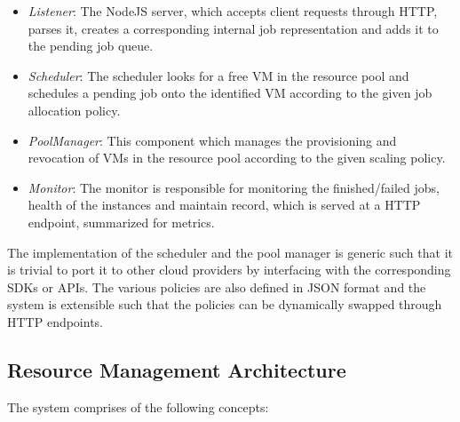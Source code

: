 \documentclass[a4paper]{IEEEtran}
\begin{document}
 \begin{itemize}
   \item \emph{Listener}: The NodeJS server, which accepts client requests through HTTP, parses it, creates a 
   corresponding internal job representation and adds it to the pending job queue.
   \item \emph{Scheduler}: The scheduler looks for a free VM in the resource pool and schedules a pending job
   onto the identified VM according to the given job allocation policy.
   \item \emph{PoolManager}: This component which manages the provisioning and revocation of VMs in the resource 
   pool according to the given scaling policy.
   \item \emph{Monitor}: The monitor is responsible for monitoring the finished/failed jobs, health of the instances
    and maintain record, which is served at a HTTP endpoint, summarized for metrics.
 \end{itemize}

The implementation of the scheduler and the pool manager is generic such that it is trivial to port it to other 
cloud providers by interfacing with the corresponding SDKs or APIs. The various policies are also defined in JSON
format and the system is extensible such that the policies can be dynamically swapped through HTTP endpoints.

\subsection{Resource Management Architecture}

The system comprises of the following concepts:
\end{document}
